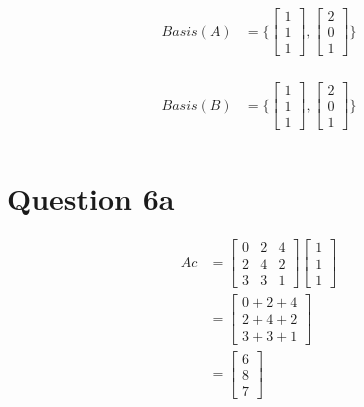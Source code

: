 \documentclass{article}
\begin{document}
    \begin{align*}
        Basis(A)   &= \bigl\{ \begin{bmatrix}
                        1 \\
                        1 \\
                        1
                    \end{bmatrix},
                    \begin{bmatrix}
                        2 \\
                        0 \\
                        1
                    \end{bmatrix} \bigr\} \\
    \end{align*}

    \begin{align*}
        Basis(B)   &= \bigl\{ \begin{bmatrix}
                        1 \\
                        1 \\
                        1
                    \end{bmatrix},
                    \begin{bmatrix}
                        2 \\
                        0 \\
                        1
                    \end{bmatrix} \bigr\} \\
    \end{align*}

    \section*{Question 6a}
    \begin{align*}
        Ac  &=  \begin{bmatrix}
                0 & 2 & 4 \\
                2 & 4 & 2 \\
                3 & 3 & 1
                \end{bmatrix}
                \begin{bmatrix}
                    1 \\
                    1 \\
                    1
                \end{bmatrix} \\
            &=  \begin{bmatrix}
                0 + 2 + 4 \\
                2 + 4 + 2 \\
                3 + 3 + 1
                \end{bmatrix} \\
            &=  \begin{bmatrix}
                6 \\
                8 \\
                7
                \end{bmatrix}
    \end{align*}
\end{document}
